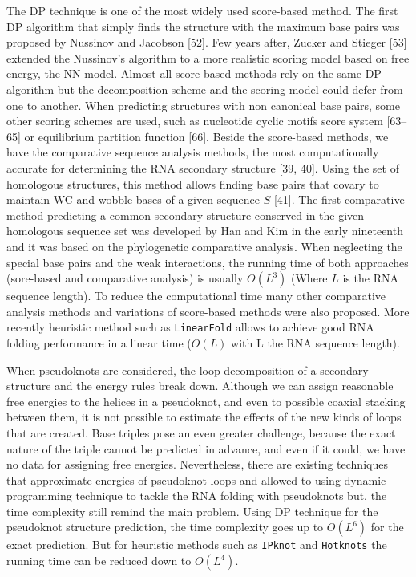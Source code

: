 The DP technique is one of the most widely used score-based method. The first DP algorithm that simply finds the structure with the maximum base pairs was proposed by Nussinov and Jacobson [52]. Few years after, Zucker and Stieger [53] extended the Nussinov's algorithm to a more realistic scoring model based on free energy, the NN model. Almost all score-based methods rely on the same DP algorithm but the decomposition scheme and the scoring model could defer from one to another. When predicting structures with non canonical base pairs, some other scoring schemes are used, such as nucleotide cyclic motifs score system [63–65] or equilibrium partition function [66].  Beside the score-based methods, we have the comparative sequence analysis methods, the most computationally accurate for determining the RNA secondary structure [39, 40]. Using the set of homologous structures, this method allows finding base pairs that covary to maintain WC and wobble bases of a given sequence $S$ [41]. The first comparative method predicting a common secondary structure conserved in the given homologous sequence set was developed by Han and Kim in the early nineteenth and it was based on the phylogenetic comparative analysis. When neglecting the special base pairs and the weak interactions, the running time of both approaches (sore-based and comparative analysis) is usually $O(L^3)$ (Where $L$ is the RNA sequence length).  To reduce the computational time many other comparative analysis methods and variations of score-based methods were also proposed.  More recently heuristic method such as \texttt{LinearFold} allows to achieve good RNA folding performance in a linear time ($O(L)$ with L the RNA sequence length). 

When pseudoknots are considered, the loop decomposition of a secondary structure and the energy rules break down. Although we can assign reasonable free energies to the helices in a pseudoknot, and even to possible coaxial stacking between them, it is not possible to estimate the effects of the new kinds of loops that are created. Base triples pose an even greater challenge, because the exact nature of the triple cannot be predicted in advance, and even if it could, we have no data for assigning free energies.
Nevertheless, there are existing techniques that approximate energies of pseudoknot loops and allowed to using dynamic programming technique to tackle the RNA folding with pseudoknots but, the time complexity still remind the main problem. Using DP technique for the pseudoknot structure prediction, the time complexity goes up to $O(L^6)$ for the exact prediction. But for heuristic methods such as \texttt{IPknot} and \texttt{Hotknots} the running time can be reduced down to $O(L^4)$. 

